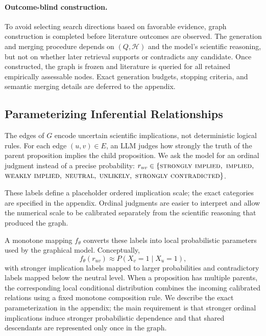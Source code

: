\documentclass[twoside]{article}
\begin{document}
\paragraph{Outcome-blind construction.}
To avoid selecting search directions based on favorable evidence, graph
construction is completed before literature outcomes are observed. The
generation and merging procedure depends on $(Q,\mathcal{H})$ and the model's
scientific reasoning, but not on whether later retrieval supports or
contradicts any candidate. Once constructed, the graph is frozen and literature
is queried for all retained empirically assessable nodes. Exact generation
budgets, stopping criteria, and semantic merging details are deferred to the
appendix.

\subsection{Parameterizing Inferential Relationships}
\label{sec:implication}

The edges of $G$ encode uncertain scientific implications, not
deterministic logical rules. For each edge $(u,v)\in E$, an LLM judges how
strongly the truth of the parent proposition implies the child proposition.
We ask the model for an ordinal judgment instead of a precise probability: 
$r_{uv}\in \{\textsc{strongly implied},$
$\textsc{implied},$
$\textsc{weakly implied},$
$\textsc{neutral},$
$\textsc{unlikely},$
$\textsc{strongly contradicted}\}$.
    
These labels define a placeholder ordered implication scale; the exact
categories are specified in the appendix. Ordinal judgments are easier to
interpret and allow the numerical scale to be calibrated separately from the
scientific reasoning that produced the graph.

A monotone mapping $f_{\theta}$ converts these labels into local probabilistic
parameters used by the graphical model. Conceptually,
\begin{equation}
    f_{\theta}(r_{uv})
    \approx
    P(X_v=1\mid X_u=1),
\end{equation}
with stronger implication labels mapped to larger probabilities and
contradictory labels mapped below the neutral level. When a proposition has
multiple parents, the corresponding local conditional distribution combines
the incoming calibrated relations using a fixed monotone composition rule. We
describe the exact parameterization in the appendix; the main requirement is
that stronger ordinal implications induce stronger probabilistic dependence
and that shared descendants are represented only once in the graph.
\end{document}
